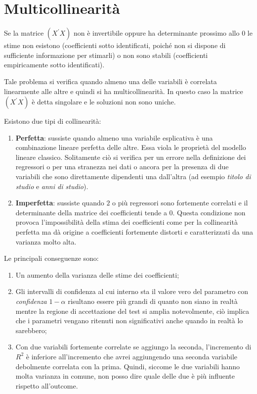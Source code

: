 \documentclass[a4page, 11pt]{article} %
\begin{document}
\section{Multicollinearità }

Se la matrice $(X^{\prime} X)$ non è invertibile oppure ha determinante prossimo allo 0 le stime non esistono (coefficienti sotto identificati, poiché non si dispone di sufficiente informazione per stimarli) o non sono stabili (coefficienti empiricamente sotto identificati).

Tale problema si verifica quando almeno una delle variabili è correlata linearmente alle altre e quindi si ha multicollinearità. In questo caso la matrice $(X^{\prime} X)$ è detta singolare e le soluzioni non sono uniche. 

Esistono due tipi di collinearità:
\begin{enumerate}[noitemsep]
\item \textbf{Perfetta}: sussiste quando almeno una variabile esplicativa è una combinazione lineare perfetta delle altre. Essa viola le proprietà del modello lineare classico. Solitamente ciò si verifica per un errore nella definizione dei regressori o per una stranezza nei dati o ancora per la presenza di due variabili che sono direttamente dipendenti una dall'altra (ad esempio \textit{titolo di studio} e \textit{anni di studio}).
\item \textbf{Imperfetta}: sussiste quando $2$ o più regressori sono fortemente correlati e il determinante della matrice dei coefficienti tende a $0$. Questa condizione non provoca l'impossibilità della stima dei coefficienti come per la collinearità perfetta ma dà origine a coefficienti fortemente distorti e caratterizzati da una varianza molto alta.
\end{enumerate}
Le principali conseguenze sono:
\begin{enumerate}[noitemsep]
\item Un aumento della varianza delle stime dei coefficienti;
\item Gli intervalli di confidenza al cui interno sta il valore vero del parametro con \textit{confidenza} $1-\alpha$ risultano essere più grandi di quanto non siano in realtà mentre la regione di accettazione del test si amplia notevolmente, ciò implica che i parametri vengano ritenuti non significativi anche quando in realtà lo sarebbero;
\item Con due variabili fortemente correlate se aggiungo la seconda, l’incremento di $R^{2}$ è inferiore all’incremento che avrei aggiungendo una seconda variabile debolmente correlata con la prima. Quindi, siccome le due variabili hanno molta varianza in comune, non posso dire quale delle due è più influente rispetto all’outcome.
\end{enumerate}
\end{document}
